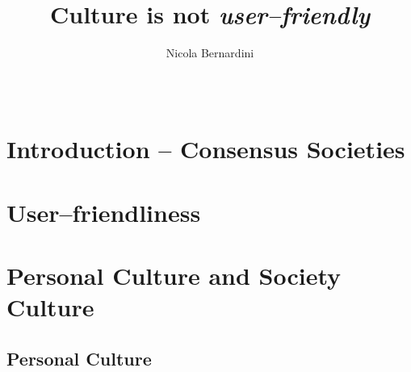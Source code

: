 \documentclass{scrartcl}
\title{Culture is not \emph{user--friendly}}
\author{Nicola Bernardini}
\date{~}
\begin{document}
\maketitle

\section{Introduction -- Consensus Societies}


\section{User--friendliness}

\section{Personal Culture and Society Culture}


\subsection{Personal Culture}
\end{document}
